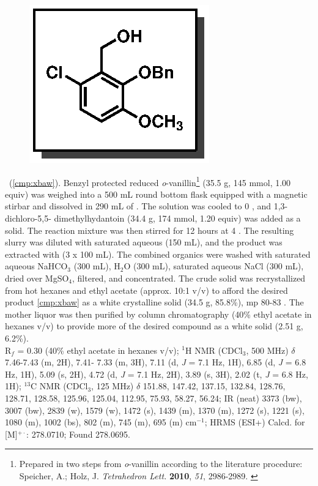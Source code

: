 \vspace{10pt}
\begin{figure}
  \vspace{-25pt}
  \begin{center}
    \includegraphics[scale=0.8]{chp_singlecarbon/images/xbaw}
  \end{center}
  \vspace{-30pt}
\end{figure}\noindent \textbf{\CMPxbaw}\ (\ref{cmp:xbaw}). Benzyl protected reduced
\textit{o}-vanillin\footnote{Prepared in two steps from \textit{o}-vanillin according to the
literature procedure:
{\frenchspacing Speicher, A.; Holz, J. \textit{Tetrahedron Lett.} \textbf{2010},	\textit{51},
2986-2989.} \label{ref:holz}} (35.5 g, 145 mmol, 1.00 equiv) was weighed into a 500 mL round bottom
flask equipped with a magnetic stirbar and dissolved in 290 mL of . The solution was cooled to 0 \degc, and 1,3-dichloro-5,5-
dimethylhydantoin (34.4 g, 174 mmol, 1.20 equiv) was added as a solid. The reaction mixture was then
stirred for 12 hours at 4 \degc. The resulting slurry was diluted with saturated aqueous
 (150 mL), and the product was extracted with  (3 x 100 mL). The combined
organics were washed with saturated aqueous NaHCO$_3$ (300 mL), H$_2$O (300 mL), saturated aqueous
NaCl (300 mL), dried over MgSO$_4$, filtered, and concentrated. The crude solid was recrystallized
from hot hexanes and ethyl acetate (approx. 10:1 v/v) to afford the desired product \ref{cmp:xbaw}
as a white crystalline solid (34.5 g, 85.8\%), mp 80-83 \degc. The mother liquor was then purified
by column chromatography (40\% ethyl acetate in hexanes v/v) to provide more of the desired compound
as a white solid (2.51 g, 6.2\%).\\
R$_f$ = 0.30 (40\% ethyl acetate in hexanes v/v); $^1$H NMR (CDCl$_3$, 500 MHz) $\delta$ 7.46-7.43 (m, 2H), 7.41-
7.33 (m, 3H), 7.11 (d, \textit{J} = 7.1 Hz, 1H), 6.85 (d, \textit{J} = 6.8 Hz, 1H), 5.09 (s, 2H), 4.72 (d, \textit{J} = 7.1 Hz,
2H), 3.89 (s, 3H), 2.02 (t, \textit{J} = 6.8 Hz, 1H); $^{13}$C NMR (CDCl$_3$, 125 MHz) $\delta$ 151.88, 147.42,
137.15, 132.84, 128.76, 128.71, 128.58, 125.96, 125.04, 112.95, 75.93, 58.27, 56.24; IR (neat)
3373 (bw), 3007 (bw), 2839 (w), 1579 (w), 1472 (s), 1439 (m), 1370 (m), 1272 (s), 1221 (s), 1080 (m), 1002 (bs), 802 (m), 745 (m), 695 (m) cm$^{-1}$; HRMS (ESI+) Calcd. for  [M]$^{+\cdot}$: 278.0710; Found 278.0695.

